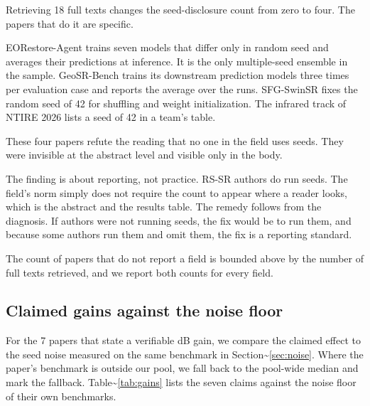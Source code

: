 \documentclass{interact}
\begin{document}
Retrieving 18 full texts changes the seed-disclosure count from zero to four. The papers that do it are specific.

EORestore-Agent \citep{qi2026} trains seven models that differ only in random seed and averages their predictions at inference. It is the only multiple-seed ensemble in the sample. GeoSR-Bench \citep{li2026} trains its downstream prediction models three times per evaluation case and reports the average over the runs. SFG-SwinSR \citep{hossain2026} fixes the random seed of 42 for shuffling and weight initialization. The infrared track of NTIRE 2026 \citep{chen2026} lists a seed of 42 in a team's table.

These four papers refute the reading that no one in the field uses seeds. They were invisible at the abstract level and visible only in the body.

The finding is about reporting, not practice. RS-SR authors do run seeds. The field's norm simply does not require the count to appear where a reader looks, which is the abstract and the results table. The remedy follows from the diagnosis. If authors were not running seeds, the fix would be to run them, and because some authors run them and omit them, the fix is a reporting standard.

The count of papers that do not report a field is bounded above by the number of full texts retrieved, and we report both counts for every field.

\subsection{Claimed gains against the noise floor}\label{sec:gains}

For the 7 papers that state a verifiable dB gain, we compare the claimed effect to the seed noise measured on the same benchmark in Section\textasciitilde{}\ref{sec:noise}. Where the paper's benchmark is outside our pool, we fall back to the pool-wide median and mark the fallback. Table\textasciitilde{}\ref{tab:gains} lists the seven claims against the noise floor of their own benchmarks.
\end{document}
